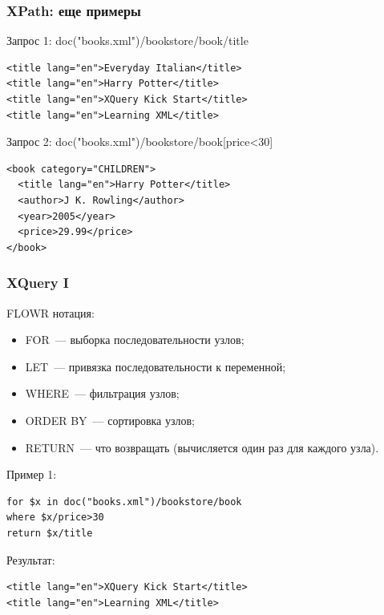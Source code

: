 \documentclass{beamer}
\begin{document}
\begin{frame}[fragile]
\frametitle{XPath: еще примеры}

\lstset{language=XML} 

Запрос 1: doc("books.xml")/bookstore/book/title 

\begin{lstlisting}
<title lang="en">Everyday Italian</title>
<title lang="en">Harry Potter</title>
<title lang="en">XQuery Kick Start</title>
<title lang="en">Learning XML</title> 
\end{lstlisting}


Запрос 2: doc("books.xml")/bookstore/book[price<30] 



\begin{lstlisting}
<book category="CHILDREN">
  <title lang="en">Harry Potter</title>
  <author>J K. Rowling</author>
  <year>2005</year>
  <price>29.99</price>
</book> 
\end{lstlisting}


\end{frame}


\begin{frame}[fragile]
\frametitle{XQuery I}

FLOWR нотация:

\begin{itemize}
  \item FOR~--- выборка последовательности узлов;
  \item LET~--- привязка последовательности к переменной;
  \item WHERE~--- фильтрация узлов;
  \item ORDER BY~--- сортировка узлов;
  \item RETURN~--- что возвращать (вычисляется один раз для каждого узла).
\end{itemize}

Пример 1:
\lstset{language=XML} 
\begin{lstlisting}
for $x in doc("books.xml")/bookstore/book
where $x/price>30
return $x/title 
\end{lstlisting}
Результат:
\begin{lstlisting}
<title lang="en">XQuery Kick Start</title>
<title lang="en">Learning XML</title> 
\end{lstlisting}

\end{frame}
\end{document}

